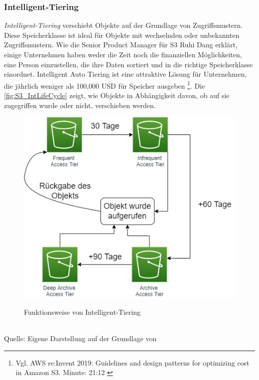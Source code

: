 \subsubsection{Intelligent-Tiering}
\textit{Intelligent-Tiering} verschiebt Objekte auf der Grundlage von Zugriffsmustern. Diese Speicherklasse ist ideal für Objekte mit wechselnden oder unbekannten Zugriffsmustern. Wie die Senior Product Manager für S3 Ruhi Dang erklärt, einige Unternehmen haben weder die Zeit noch die finanziellen Möglichkeiten, eine Person einzustellen, die ihre Daten sortiert und in die richtige Speicherklasse einordnet. Intelligent Auto Tiering ist eine attraktive Lösung für Unternehmen, die jährlich weniger als 100,000 USD für Speicher ausgeben \footnote{Vgl. AWS re:Invent 2019: Guidelines and design patterns for optimizing cost in Amazon S3. Minute: 21:12 \cite{AMZ16}}.
Die \autoref{fig:S3_IntLifeCycle} zeigt, wie Objekte in Abhängigkeit davon, ob auf sie zugegriffen wurde oder nicht, verschieben werden. 
\begin{figure}[h!]
  \centering
  \includegraphics[scale=0.7]{sources/S3_IntLifeCycle}
  \caption[Funktionsweise von Intelligent-Tiering]{}\label{fig:S3_IntLifeCycle} Funktionsweise von Intelligent-Tiering
\end{figure}\\
Quelle: Eigene Darstellung auf der Grundlage von \\
